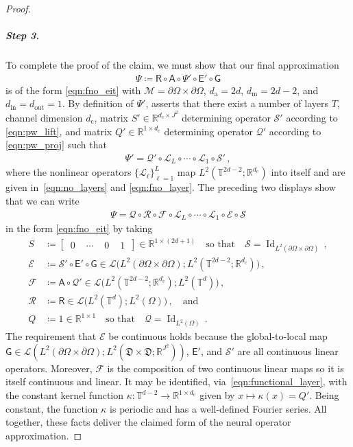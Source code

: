 \documentclass[pdflatex,sn-mathphys-num]{sn-jnl-preprint}
\newcommand{\R}{\mathbb{R}}
\newcommand{\T}{\mathbb{T}}
\newcommand{\cL}{\mathcal{L}}
\newcommand{\cF}{\mathcal{F}}
\newcommand{\cS}{\mathcal{S}}
\newcommand{\cR}{\mathcal{R}}
\newcommand{\cE}{\mathcal{E}}
\newcommand{\cQ}{\mathcal{Q}}
\newcommand{\cM}{\mathcal{M}}
\newcommand{\sL}{\mathscr{L}}
\newcommand{\sfA}{\mathsf{A}}
\newcommand{\sfE}{\mathsf{E}}
\newcommand{\sfG}{\mathsf{G}}
\newcommand{\sfR}{\mathsf{R}}
\newcommand{\pOmega}{{\partial\Omega}}
\newcommand{\defeq}{\coloneqq} %
\DeclareMathOperator{\Id}{Id} %
\def\qa{\quad\text{and}\quad}
\theoremstyle{thmstyleone}%
\theoremstyle{thmstyletwo}%
\theoremstyle{thmstylethree}%
\numberwithin{equation}{section}
\numberwithin{theorem}{section}
\begin{document}
\begin{proof}
    \subparagraph*{\emph{\textbf{Step 3.}}}
    To complete the proof of the claim, we must show that our final approximation
    \begin{align*}
        \Psi\defeq \sfR\circ\sfA\circ\Psi'\circ\sfE'\circ\sfG
    \end{align*}
    is of the form \eqref{eqn:fno_eit} with $\cM=\pOmega\times\pOmega$, $d_\mathrm{a}=2d$, $d_\mathrm{m}=2d-2$, and $d_\mathrm{in}=d_\mathrm{out}=1$. By definition of $\Psi'$, \cite[Lemma~B.1, p.~34]{huang2025operator} asserts that there exist a number of layers $T$, channel dimension $d_\mathrm{c}$, matrix $S'\in\R^{d_\mathrm{c}\times J^2}$ determining operator $\cS'$ according to \eqref{eqn:pw_lift}, and matrix $Q'\in \R^{1\times d_\mathrm{c}}$ determining operator $\cQ'$ according to \eqref{eqn:pw_proj} such that
    \begin{align*}
        \Psi'=\cQ'\circ \cL_L\circ \cdots \circ \cL_1\circ \cS'\,,
    \end{align*}
    where the nonlinear operators $\{\cL_\ell\}_{\ell=1}^L$ map $L^2(\T^{2d-2};\R^{d_\mathrm{c}})$ into itself and are given in~\eqref{eqn:no_layers} and \eqref{eqn:fno_layer}. The preceding two displays show that we can write
    \begin{align*}
        \Psi= \cQ \circ\cR\circ \cF\circ\cL_L\circ\cdots\circ\cL_1\circ\cE\circ \cS
    \end{align*}
    in the form \eqref{eqn:fno_eit} by taking
    \begin{align*}
        S&\defeq 
        \begin{bmatrix}
            \,0\,&\,\cdots\,& \,0\,& \,1\,
        \end{bmatrix}
        \in\R^{1\times (2d+1)}\quad\text{so that}\quad \cS=\Id_{L^2(\pOmega\times\pOmega)}\,,\\
        \cE &\defeq \cS'\circ\sfE'\circ\sfG\in\sL\bigl(L^2(\pOmega\times\pOmega);L^2(\T^{2d-2};\R^{d_\mathrm{c}})\bigr)\,,\\
        \cF&\defeq\sfA\circ \cQ'\in \sL\bigl(L^2(\T^{2d-2};\R^{d_\mathrm{c}}); L^2(\T^d)\bigr)\,,\\
        \cR&\defeq\sfR\in \sL\bigl(L^2(\T^d); L^2(\Omega)\bigr)\,,\qa\\
        Q&\defeq 1\in\R^{1\times 1} \quad\text{so that}\quad \cQ=\Id_{L^2(\Omega)}\,.
    \end{align*}
    The requirement that $\cE$ be continuous holds because the global-to-local map $\sfG\in\sL(L^2(\pOmega\times\pOmega); L^2(\mathfrak{D}\times\mathfrak{D};\R^{J^2}))$, $\sfE'$, and $\cS'$ are all continuous linear operators. Moreover, $\cF$ is the composition of two continuous linear maps so it is itself continuous and linear. It may be identified,  via~\eqref{eqn:functional_layer}, with the constant kernel function $\kappa\colon \T^{d-2}\to\R^{1\times d_\mathrm{c}}$ given by $x\mapsto \kappa(x)=Q'$. Being constant, the function $\kappa$ is periodic and has a well-defined Fourier series.
    All together, these facts deliver the claimed form of the neural operator approximation.
\end{proof}
\end{document}
